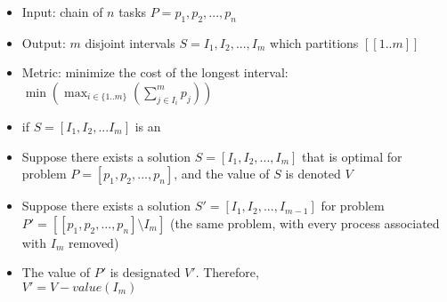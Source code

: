 \documentclass[landscape]{slides}
\begin{document}

\begin{slide} %
	\begin{itemize}
    \item Input: chain of $n$ tasks $P = p_1, p_2, ..., p_n$
    \item Output: $m$ disjoint intervals  $S = I_1, I_2, ..., I_m$ which
    			partitions $[[1..m]]$
    \item Metric: minimize the cost of the longest interval:
    			$\min(\max_{i\in\{1..m\}}(\sum_{j \in{I_i}}^m p_j))$
	\end{itemize}
\end{slide}

\begin{slide} %
	\begin{itemize}
	\item if $S = [I_1, I_2, ... I_m]$ is an 
	\end{itemize}
\end{slide}

\begin{slide} %
	\begin{itemize}
		\item Suppose there exists a solution 
		$S = [I_1, I_2, ..., I_m]$ that is optimal for problem 
		$P = [p_1, p_2, ..., p_n]$, and the value of $S$ is denoted $V$
		\item Suppose there exists a solution $S' = [I_1, I_2, ..., I_{m-1}]$
		for problem $P'= [[p_1, p_2, ..., p_n] \setminus I_m]$ (the same problem,
		with every process associated with $I_m$ removed)
		\item The value of $P'$ is designated $V'$. Therefore, 
		\\$V' = V - value(I_m)$
	\end{itemize}
\end{slide}

\begin{slide} %
\end{slide}
\end{document}
